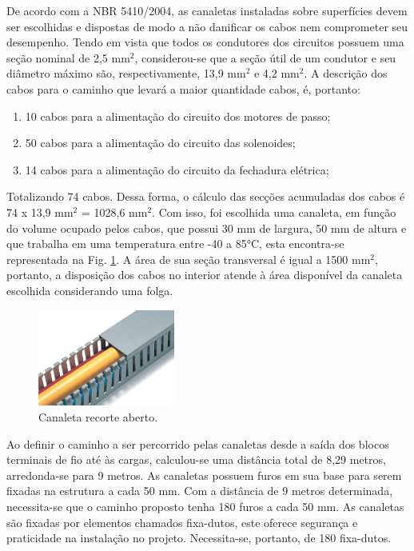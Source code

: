 De acordo com a NBR 5410/2004, as canaletas instaladas sobre superfícies devem ser escolhidas e dispostas de modo a não danificar os cabos nem comprometer seu desempenho. Tendo em vista que todos os condutores dos circuitos possuem uma seção nominal de 2,5 $\text{mm}^2$, considerou-se que a seção útil de um condutor e seu diâmetro máximo são, respectivamente, 13,9 $\text{mm}^2$ e 4,2 $\text{mm}^2$. A descrição dos cabos para o caminho que levará a maior quantidade cabos, é, portanto:

\begin{enumerate}
    \item 10 cabos para a alimentação do circuito dos motores de passo;
    \item 50 cabos para a alimentação do circuito das solenoides;
    \item 14 cabos para a alimentação do circuito da fechadura elétrica;
\end{enumerate}

Totalizando 74 cabos. Dessa forma, o cálculo das secções acumuladas dos cabos é 74 x 13,9 $\text{mm}^2$ = 1028,6 $\text{mm}^2$. Com isso, foi escolhida uma canaleta, em função do volume ocupado pelos cabos, que possui 30 mm de largura, 50 mm de altura e que trabalha em uma temperatura entre -40 a 85°C, esta encontra-se representada na Fig. \ref{fig:energia_canaleta}. A área de sua seção transversal é igual a 1500 $\text{mm}^2$, portanto, a disposição dos cabos no interior atende à área disponível da canaleta escolhida considerando uma folga. 

\begin{figure}[H]
\centering
    \includegraphics[width=0.4\textwidth]{figuras/energia/fotos_componentes/canaleta.png}
    \caption{Canaleta recorte aberto.}
    \label{fig:energia_canaleta}
\end{figure}

Ao definir o caminho a ser percorrido pelas canaletas desde a saída dos blocos terminais de fio até às cargas, calculou-se uma distância total de 8,29 metros, arredonda-se para 9 metros. As canaletas possuem furos em sua base para serem fixadas na estrutura a cada 50 mm. Com a distância de 9 metros determinada, necessita-se que o caminho proposto tenha 180 furos a cada 50 mm. As canaletas são fixadas por elementos chamados fixa-dutos, este oferece segurança e praticidade na instalação no projeto. Necessita-se, portanto, de 180 fixa-dutos. 


